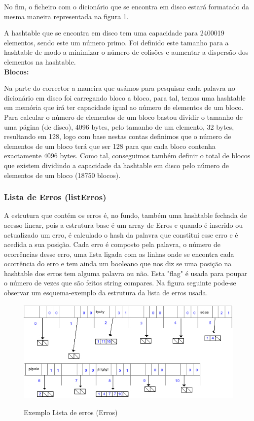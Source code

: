 No fim, o ficheiro com o dicionário que se encontra em disco estará formatado da mesma maneira representada na figura 1.

A hashtable que se encontra em disco tem uma capacidade para 2400019 elementos, sendo este um número primo. Foi definido este tamanho para a hashtable de modo a minimizar o número de colisões e aumentar a dispersão dos elementos na hashtable.\\ 

\textbf{Blocos:}

Na parte do corrector a maneira que usámos para pesquisar cada palavra no dicionário em disco foi carregando bloco a bloco, para tal, temos uma hashtable em memória que irá ter capacidade igual ao número de elementos de um bloco. Para calcular o número de elementos de um bloco bastou dividir o tamanho de uma página (de disco), 4096 bytes, pelo tamanho de um elemento, 32 bytes, resultando em 128, logo com base nestas contas definimos que o número de elementos de um bloco terá que ser 128 para que cada bloco contenha exactamente 4096 bytes. Como tal, conseguimos também definir o total de blocos que existem dividindo a capacidade da hashtable em disco pelo número de elementos de um bloco (18750 blocos).

\subsubsection{Lista de Erros (listErros)}

\FloatBarrier
A estrutura que contém os erros é, no fundo, também uma hashtable fechada de acesso linear, pois a estrutura base é um array de Erros e quando é inserido ou actualizado um erro, é calculado o hash da palavra que constitui esse erro e é acedida a sua posição. Cada erro é composto pela palavra, o número de ocorrências desse erro, uma lista ligada com as linhas onde se encontra cada ocorrência do erro e tem ainda um booleano que nos diz se uma posição na hashtable dos erros tem alguma palavra ou não. Esta "flag" é usada para poupar o número de vezes que são feitos string compares. Na figura seguinte pode-se observar um esquema-exemplo da estrutura da lista de erros usada.


\begin{figure}[ht]
\centering
\includegraphics[scale=0.7]{hashTable_erros.jpg}\\[1cm]
\caption{Exemplo Lista de erros (Erros)}
\label{fig:minipage1}
\end{figure}
\FloatBarrier

